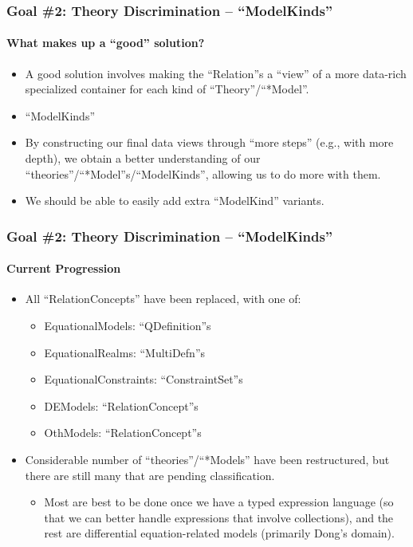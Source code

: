 \documentclass{beamer}
\begin{document}
\begin{frame}
    \frametitle{Goal \#2: Theory Discrimination -- ``ModelKinds''}
    \framesubtitle{What makes up a ``good'' solution?}
    
    \begin{itemize}
        \item<2-> A good solution involves making the ``Relation''s a ``view'' of a more data-rich specialized container for each kind of ``Theory''/``*Model''.
        \item<3-> ``ModelKinds''
        \item<4-> By constructing our final data views through ``more steps'' (e.g., with more depth), we obtain a better understanding of our ``theories''/``*Model''s/``ModelKinds'', allowing us to do more with them.
        \item<5-> We should be able to easily add extra ``ModelKind'' variants.
    \end{itemize}
\end{frame}

\begin{frame}
    \frametitle{Goal \#2: Theory Discrimination -- ``ModelKinds''}
    \framesubtitle{Current Progression}
    
    \begin{itemize}
        \item<2-> All ``RelationConcepts'' have been replaced, with one of:
            \begin{itemize}
                \item<3-> EquationalModels: ``QDefinition''s
                \item<4-> EquationalRealms: ``MultiDefn''s
                \item<5-> EquationalConstraints: ``ConstraintSet''s
                \item<6-> DEModels: ``RelationConcept''s
                \item<7-> OthModels: ``RelationConcept''s
            \end{itemize}
        \item<8-> Considerable number of ``theories''/``*Models'' have been restructured, but there are still many that are pending classification.
            \begin{itemize}
                \item<9-> Most are best to be done once we have a typed expression language (so that we can better handle expressions that involve collections), and the rest are differential equation-related models (primarily Dong's domain).
            \end{itemize}
    \end{itemize}
\end{frame}
\end{document}
